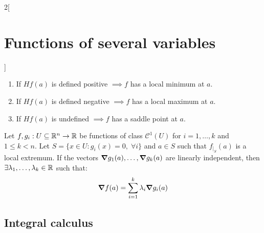 \documentclass[../../../main.tex]{subfiles}
\begin{document}
\begin{multicols}{2}[\section{Functions of several variables}]
\begin{theorem}
    \begin{enumerate}
      \item If $Hf(a)$ is defined positive $\implies f$ has a local minimum at $a$.
      \item If $Hf(a)$ is defined negative $\implies f$ has a local maximum at $a$.
      \item If $Hf(a)$ is undefined $\implies f$ has a saddle point at $a$.
    \end{enumerate}
  \end{theorem}
  \begin{theorem}
    Let $f,g_i:U\subseteq\mathbb{R}^n\rightarrow\mathbb{R} $ be functions of class $\mathcal{C}^1(U)$ for $i=1,\ldots,k$ and $1\leq k<n$. Let $S=\{x\in U:g_i(x)=0,\;\forall i\}$ and $a\in S$ such that $f_{|_S}(a)$ is a local extremum. If the vectors $\grad g_1(a),\ldots,\grad g_k(a)$ are linearly independent, then $\exists\lambda_1,\ldots,\lambda_k\in\mathbb{R} $ such that: $$\grad f(a)=\sum_{i=1}^k\lambda_i\grad g_i(a)$$
  \end{theorem}
  \subsection{Integral calculus}

\end{multicols}
\end{document}
